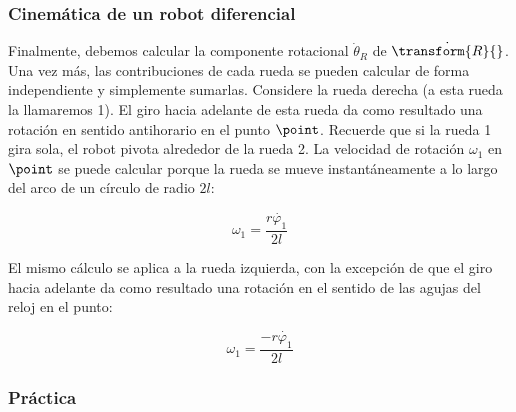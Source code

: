 \begin{frame}
    \frametitle{Cinemática de un robot diferencial}
    \small

    Finalmente, debemos calcular la componente rotacional $\dot{\theta}_{R}$ de $\dot{\transform{R}{}}$. Una vez más, las contribuciones de cada rueda se pueden calcular de forma independiente y simplemente sumarlas. Considere la rueda derecha (a esta rueda la llamaremos 1). El giro hacia adelante de esta rueda da como resultado una rotación en sentido antihorario en el punto $\point$. Recuerde que si la rueda 1 gira sola, el robot pivota alrededor de la rueda 2. La velocidad de rotación $\omega_{1}$ en $\point$ se puede calcular porque la rueda se mueve instantáneamente a lo largo del arco de un círculo de radio $2l$:

    \begin{equation*}
        \omega_{1} = \dfrac{r\dot{\varphi_{1}}}{2l}
    \end{equation*}

    El mismo cálculo se aplica a la rueda izquierda, con la excepción de que el giro hacia adelante da como resultado una rotación en el sentido de las agujas del reloj en el punto:

    \begin{equation*}
        \omega_{1} = \dfrac{-r\dot{\varphi_{1}}}{2l}
    \end{equation*}
\end{frame}

\begin{frame}
    \frametitle{Práctica}
\end{frame}
